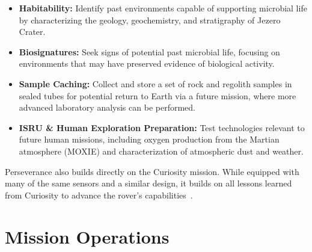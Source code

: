 \documentclass[11pt]{article}
\begin{document}
\begin{itemize}
    \item \textbf{Habitability:} Identify past environments capable of supporting microbial life by characterizing the geology, geochemistry, and stratigraphy of Jezero Crater.
    \item \textbf{Biosignatures:} Seek signs of potential past microbial life, focusing on environments that may have preserved evidence of biological activity.
    \item \textbf{Sample Caching:} Collect and store a set of rock and regolith samples in sealed tubes for potential return to Earth via a future mission, where more advanced laboratory analysis can be performed.
    \item \textbf{ISRU \& Human Exploration Preparation:} Test technologies relevant to future human missions, including oxygen production from the Martian atmosphere (MOXIE) and characterization of atmospheric dust and weather.
\end{itemize}

Perseverance also builds directly on the Curiosity mission. While equipped with many of the same sensors
and a similar design, it builds on all lessons learned from Curiosity to advance the rover's
capabilities~\cite{rover_components}.

\section*{Mission Operations}
\end{document}
